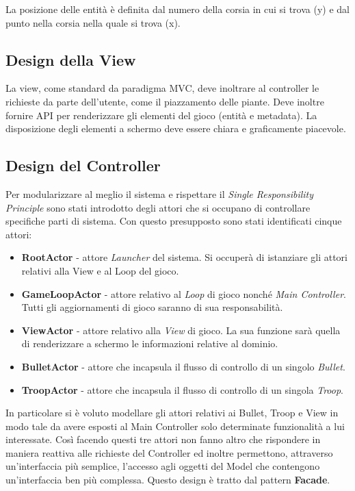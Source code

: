 La posizione delle entità è definita dal numero della corsia in cui si trova (y) e dal punto nella corsia nella quale si trova (x).

\subsection{Design della View}
La view, come standard da paradigma MVC, deve inoltrare al controller le richieste da parte dell'utente,
come il piazzamento delle piante.
Deve inoltre fornire API per renderizzare gli elementi del gioco (entità e metadata).
La disposizione degli elementi a schermo deve essere chiara e graficamente piacevole.

\subsection{Design del Controller}
Per modularizzare al meglio il sistema e rispettare il \textit{Single Responsibility Principle}
sono stati introdotto degli attori che si occupano di controllare specifiche parti di sistema. Con questo presupposto sono
stati identificati cinque attori:
\begin{itemize}
    \item \textbf{RootActor} - attore \textit{Launcher} del sistema. Si occuperà di
    istanziare gli attori relativi alla View e al Loop del gioco.
    \item \textbf{GameLoopActor} - attore relativo al \textit{Loop} di gioco nonché
    \textit{Main Controller}. Tutti gli aggiornamenti di gioco saranno di sua responsabilità.
    \item \textbf{ViewActor} - attore relativo alla \textit{View} di gioco.
    La sua funzione sarà quella di renderizzare a schermo le informazioni relative al dominio.
    \item \textbf{BulletActor} - attore che incapsula il flusso di controllo di un singolo \textit{Bullet}.
    \item \textbf{TroopActor} - attore che incapsula il flusso di controllo di un singola \textit{Troop}.
\end{itemize}
In particolare si è voluto modellare gli attori relativi ai Bullet, Troop e
View in modo tale da avere esposti al Main
Controller solo determinate funzionalità a lui interessate.
Così facendo questi tre attori non fanno altro che rispondere
in maniera reattiva alle richieste del Controller ed inoltre permettono,
attraverso un'interfaccia più semplice, l'accesso
agli oggetti del Model che contengono un'interfaccia ben più complessa.
Questo design è tratto dal pattern \textbf{Facade}.

